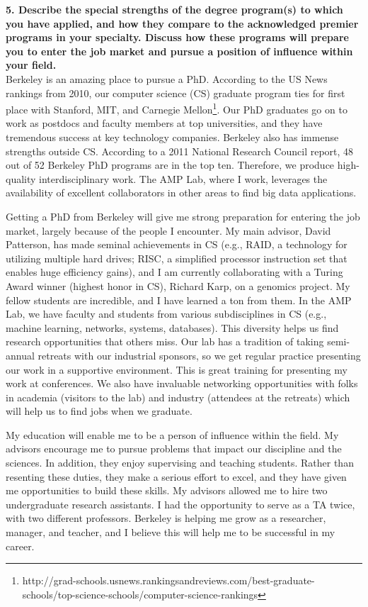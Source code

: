 \documentclass{article}
\begin{document}
\pagestyle{plain}

\noindent\textbf{5.  Describe the special strengths of the degree program(s) to which you have applied, and how they compare to the acknowledged premier programs in your specialty. Discuss how these programs will prepare you to enter the job market and pursue a position of influence within your field.}\\

Berkeley is an amazing place to pursue a PhD.
According to the US News rankings from 2010, our computer science (CS) graduate program ties for first place with Stanford, MIT, and Carnegie Mellon\footnote{http://grad-schools.usnews.rankingsandreviews.com/best-graduate-schools/top-science-schools/computer-science-rankings}.  
Our PhD graduates go on to work as postdocs and faculty members at top universities, and they have tremendous success at key technology companies.
Berkeley also has immense strengths outside CS.
According to a 2011 National Research Council report, 48 out of 52 Berkeley PhD programs are in the top ten.
Therefore, we produce high-quality interdisciplinary work.
The AMP Lab, where I work, leverages the availability of excellent collaborators in other areas to find big data applications.

Getting a PhD from Berkeley will give me strong preparation for entering the job market, largely because of the people I encounter.
My main advisor, David Patterson, has made seminal achievements in CS (e.g., RAID, a technology for utilizing multiple hard drives; RISC, a simplified processor instruction set that enables huge efficiency gains), and I am currently collaborating with a Turing Award winner (highest honor in CS), Richard Karp, on a genomics project.
My fellow students are incredible, and I have learned a ton from them.
In the AMP Lab, we have faculty and students from various subdisciplines in CS (e.g., machine learning, networks, systems, databases).
This diversity helps us find research opportunities that others miss.
Our lab has a tradition of taking semi-annual retreats with our industrial sponsors, so we get regular practice presenting our work in a supportive environment.
This is great training for presenting my work at conferences.
We also have invaluable networking opportunities with folks in academia (visitors to the lab) and industry (attendees at the retreats) which will help us to find jobs when we graduate.

My education will enable me to be a person of influence within the field.
My advisors encourage me to pursue problems that impact our discipline and the sciences.
In addition, they enjoy supervising and teaching students.
Rather than resenting these duties, they make a serious effort to excel, and they have given me opportunities to build these skills.
My advisors allowed me to hire two undergraduate research assistants.
I had the opportunity to serve as a TA twice, with two different professors.
Berkeley is helping me grow as a researcher, manager, and teacher, and I believe this will help me to be successful in my career.
\end{document}
